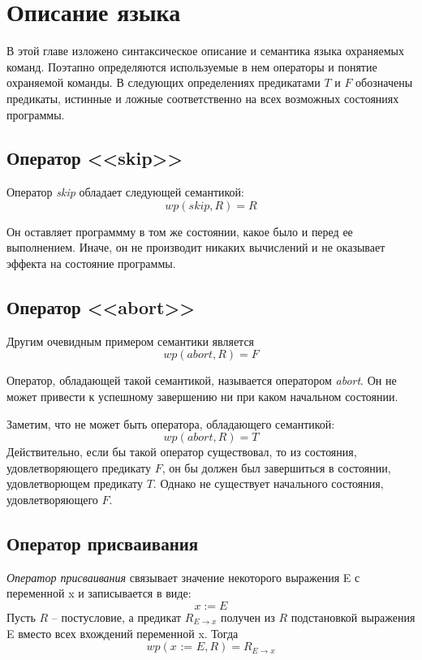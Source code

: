 \chapter{Описание языка} \label{ch2}
В этой главе изложено синтаксическое описание и семантика языка охраняемых команд.
Поэтапно определяются используемые в нем операторы и понятие охраняемой команды.
В следующих определениях предикатами $T$ и $F$ обозначены предикаты,
истинные и ложные соответственно на всех возможных состояниях программы.

\section{Оператор <<skip>>}
Оператор \textit{skip} обладает следующей семантикой: 
\begin{equation}
	wp(\textit{skip}, R) = R
\end{equation}

Он оставляет программму в том же состоянии, какое было и перед ее
выполнением. Иначе, он не производит никаких вычислений и не оказывает эффекта на состояние программы.

\section{Оператор <<abort>>}
Другим очевидным примером семантики является
\begin{equation}
	wp(\textit{abort}, R) = F
\end{equation}

Оператор, обладающей такой семантикой, называется оператором \textit{abort}.
Он не может привести к успешному завершению ни при каком начальном состоянии.

Заметим, что не может быть оператора, обладающего семантикой:
\begin{equation}
	wp(\textit{abort}, R) = T
\end{equation}
Действительно, если бы такой оператор существовал, то из состояния, удовлетворяющего предикату $F$,
он бы должен был завершиться в состоянии, удовлетворющем предикату $T$. Однако не существует
начального состояния, удовлетворяющего $F$.

\section{Оператор присваивания}
\textit{Оператор присваивания} связывает значение некоторого выражения E с переменной x и записывается в виде:
\begin{equation}
	x := E
\end{equation}
Пусть $R$ -- постусловие, а предикат $R_{E\rightarrow x}$ получен из $R$ подстановкой выражения E вместо
всех вхождений переменной x. Тогда 
\begin{equation}
	wp(\textit{x := E}, R) = R_{E\rightarrow x}
\end{equation}

